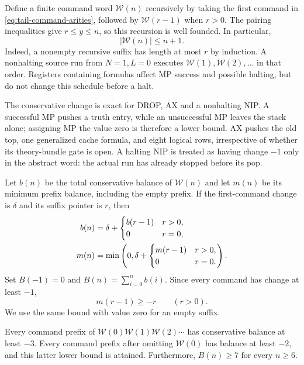 Define a finite command word $\mathcal W(n)$ recursively by taking the
first command in \eqref{eq:tail-command-arities}, followed by
$\mathcal W(r-1)$ when $r>0$. The pairing inequalities give
$r\leq y\leq n$, so this recursion is well founded. In particular,
\begin{equation}
 |\mathcal W(n)|\leq n+1.
 \label{eq:tail-word-length}
\end{equation}
Indeed, a nonempty recursive suffix has length at most $r$ by induction.
A nonhalting source run from $N=1,L=0$ executes
$\mathcal W(1),\mathcal W(2),\ldots$ in that order. Registers containing
formulas affect MP success and possible halting, but do not change this
schedule before a halt.

The conservative change is exact for DROP, AX and a nonhalting NIP.
A successful MP pushes a truth entry, while an unsuccessful MP leaves
the stack alone; assigning MP the value zero is therefore a lower
bound. AX pushes the old top, one generalized cache formula, and eight
logical rows, irrespective of whether its theory-bundle gate is open.
A halting NIP is treated as having change $-1$ only in the abstract word:
the actual run has already stopped before its pop.

Let $b(n)$ be the total conservative balance of $\mathcal W(n)$ and let
$m(n)$ be its minimum prefix balance, including the empty prefix.
If the first-command change is $\delta$ and its suffix pointer is $r$,
then
\begin{align}
 b(n)&=\delta+\begin{cases}b(r-1)&r>0,\\0&r=0,\end{cases}\notag\\
 m(n)&=\min\left(0,\delta+
               \begin{cases}m(r-1)&r>0,\\0&r=0.\end{cases}\right).
 \label{eq:tail-recursions}
\end{align}
Set $B(-1)=0$ and $B(n)=\sum_{i=0}^n b(i)$.
Since every command has change at least $-1$,
\begin{equation}
 m(r-1)\geq-r\qquad(r>0).
 \label{eq:tail-suffix-loss}
\end{equation}
We use the same bound with value zero for an empty suffix.

\begin{theorem}
\label{thm:tail-exact-debt}
Every command prefix of
$\mathcal W(0)\mathcal W(1)\mathcal W(2)\cdots$ has conservative
balance at least $-3$. Every command prefix after omitting
$\mathcal W(0)$ has balance at least $-2$, and this latter lower bound
is attained. Furthermore, $B(n)\geq7$ for every $n\geq6$.
\end{theorem}

